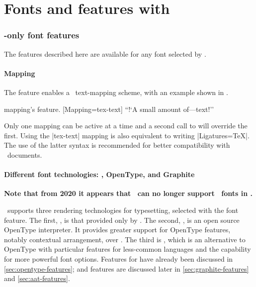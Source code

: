 \documentclass[a4paper]{l3doc}
\begin{document}
\part{Fonts and features with \XeTeX}
\label{sec:xetex-features}

\section{\XeTeX-only font features}

The features described here are available for any font
selected by .

\subsection{Mapping}
\label{sec:mapping}

The  feature enables a \XeTeX\ text-mapping scheme, with an example shown in .

\begin{Xexample}{mapping}{\XeTeX's  feature.}
  [Mapping=tex-text]
  ``!`A small amount of---text!''
\end{Xexample}

Only one mapping can be active at a time and a second call to 
will override the first.
Using the |tex-text| mapping is also equivalent to writing |Ligatures=TeX|.
The use of the latter syntax is recommended for better compatibility with
\LuaTeX\ documents.


\subsection{Different font technologies: \AAT, OpenType, and Graphite}\label{sec:renderer-xetex}

\textbf{Note that from 2020 it appears that \XeTeX\ can no longer support \AAT\ fonts in \MacOSX.}

\XeTeX\ supports three rendering technologies for typesetting, selected with
the  font feature. The first, , is
that provided only by \MacOSX.
The second, , is an open source OpenType interpreter.
It provides greater support for OpenType features, notably contextual arrangement, over .
The third is , which is an alternative to OpenType with particular features for less-common languages and the capability for more powerful font options.
Features for  have already been discussed in \vref{sec:opentype-features};
 and  features are discussed later in \vref{sec:graphite-features} and \vref{sec:aat-features}.
\end{document}
